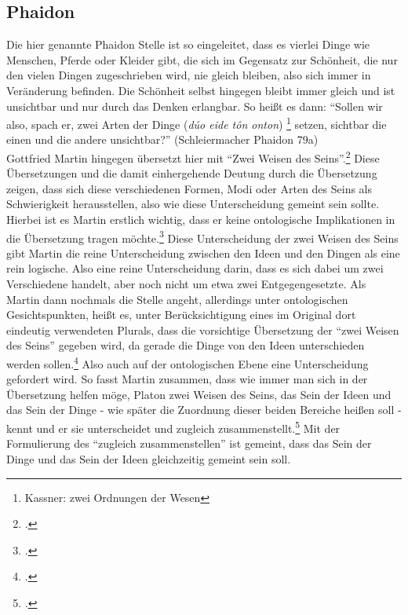 \subsection{Phaidon}
Die hier genannte Phaidon Stelle ist so eingeleitet, dass es vierlei Dinge wie Menschen, Pferde oder Kleider gibt, die sich im Gegensatz zur Schönheit, die nur den vielen Dingen zugeschrieben wird, nie gleich bleiben, also sich immer in Veränderung befinden. Die Schönheit selbst hingegen bleibt immer gleich und ist unsichtbar und nur durch das Denken erlangbar.
So heißt es dann: \enquote{Sollen wir also, spach er, zwei Arten der Dinge (\emph{dúo eide tôn onton})  \footnote{Kassner: zwei Ordnungen der Wesen\nocite{PhaidonKassner}} setzen, sichtbar die einen und die andere unsichtbar?} (Schleiermacher \nocite{PhaidonSchleiermacher}Phaidon 79a)\\
Gottfried Martin hingegen übersetzt hier mit \enquote{Zwei Weisen des Seins}.\footcite[vgl.][S. 38]{Martin73}
Diese Übersetzungen und die damit einhergehende Deutung durch die Übersetzung zeigen, dass sich diese verschiedenen Formen, Modi oder Arten des Seins als Schwierigkeit herausstellen, also wie diese Unterscheidung gemeint sein sollte. Hierbei ist es Martin erstlich wichtig, dass er keine ontologische Implikationen in die Übersetzung tragen möchte.\footcite[vgl.][S. 37]{Martin73} Diese Unterscheidung der zwei Weisen des Seins gibt Martin die reine Unterscheidung zwischen den Ideen und den Dingen als eine rein logische. Also eine reine Unterscheidung darin, dass es sich dabei um zwei Verschiedene handelt, aber noch nicht um etwa zwei Entgegengesetzte.
Als Martin dann nochmals die Stelle angeht, allerdings unter ontologischen Gesichtspunkten, heißt es, unter Berücksichtigung eines im Original dort eindeutig verwendeten Plurals, dass die vorsichtige Übersetzung der \enquote{zwei Weisen des Seins} gegeben wird, da gerade die Dinge von den Ideen unterschieden werden sollen.\footcite[vgl.][S. 216]{Martin73} Also auch auf der ontologischen Ebene eine Unterscheidung gefordert wird. So fasst Martin zusammen, dass wie immer man sich in der Übersetzung helfen möge, Platon zwei Weisen des Seins, das Sein der Ideen und das Sein der Dinge - wie später die Zuordnung dieser beiden Bereiche heißen soll - kennt und er sie unterscheidet und zugleich zusammenstellt.\footcite[vgl.][S. 216]{Martin73}
Mit der Formulierung des \enquote{zugleich zusammenstellen} ist gemeint, dass das Sein der Dinge und das Sein der Ideen gleichzeitig gemeint sein soll.
